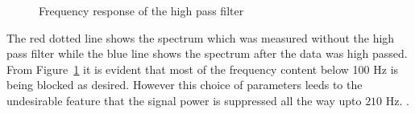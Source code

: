 \documentclass{article}
\begin{document}
\begin{figure}
\caption{Frequency response of the high pass filter} \label{fig:butterworthtest4} 
\end{figure}
The red dotted line shows the spectrum which was measured without
the high pass filter while the blue line shows the spectrum after the data was 
high passed. From Figure~\ref{fig:butterworthtest4} 
it is evident that most of the frequency content below 100 Hz is being
blocked as desired. However this choice of parameters leeds to the 
undesirable feature that the signal power is suppressed all the way upto
$210$ Hz.                                         . 
\end{document}
